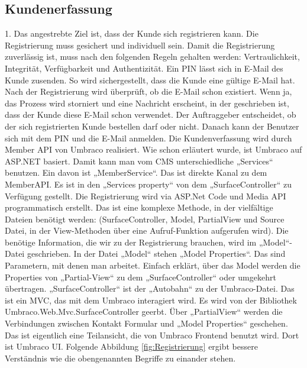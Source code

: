 \subsection{Kundenerfassung}
1. Das angestrebte Ziel ist, dass der Kunde sich registrieren kann. Die Registrierung muss gesichert und individuell sein. Damit die Registrierung zuverlässig ist, muss nach den folgenden Regeln gehalten werden: Vertraulichkeit, Integrität, Verfügbarkeit und Authentizität.
Ein \ac{PIN} lässt sich in E-Mail des Kunde zusenden. So wird sichergestellt, dass die Kunde eine gültige E-Mail hat. Nach der Registrierung wird überprüft, ob die E-Mail schon existiert. Wenn ja, das Prozess wird storniert und eine Nachricht erscheint, in der geschrieben ist, dass der Kunde diese E-Mail schon verwendet. 
Der Auftraggeber entscheidet, ob der sich registrierten Kunde bestellen darf oder nicht. Danach kann der Benutzer sich mit dem PIN und die E-Mail anmelden. 
Die Kundenverfassung wird durch Member \ac{API} von Umbraco realisiert. 
Wie schon erläutert wurde, ist Umbraco auf ASP.NET basiert. Damit kann man vom CMS unterschiedliche „Services“ benutzen. Ein davon ist „MemberService“. Das ist direkte Kanal zu dem MemberAPI. Es ist in den „Services property“ von dem „SurfaceController“ zu Verfügung gestellt. 
Die Registrierung wird via ASP.Net Code und Media API programmatisch erstellt. Das ist eine komplexe Methode, in der vielfältige Dateien benötigt werden: (SurfaceController, Model, PartialView und Source Datei, in der View-Methoden über eine Aufruf-Funktion aufgerufen wird). Die benötige Information, die wir zu der Registrierung brauchen, wird im „Model“- Datei geschrieben. 
In der Datei „Model“ stehen „Model Properties“. Das sind Parametern, mit denen man arbeitet. Einfach erklärt, über das Model werden die Properties von „Partial-View“ zu dem „SurfaceController“ oder umgekehrt übertragen.
„SurfaceController“ ist der „Autobahn“ zu der Umbraco-Datei. Das ist ein \ac{MVC}, das mit dem Umbraco interagiert wird. Es wird von der Bibliothek Umbraco.Web.Mvc.SurfaceController geerbt. 
Über „PartialView“ werden die Verbindungen zwischen Kontakt Formular und „Model Properties“ geschehen. Das ist eigentlich eine Teilansicht, die von Umbraco Frontend benutzt wird. Dort ist Umbraco \ac{UI}. 
Folgende Abbildung \ref{fig:Registrierung} ergibt bessere Verständnis wie die obengenannten Begriffe zu einander stehen.

